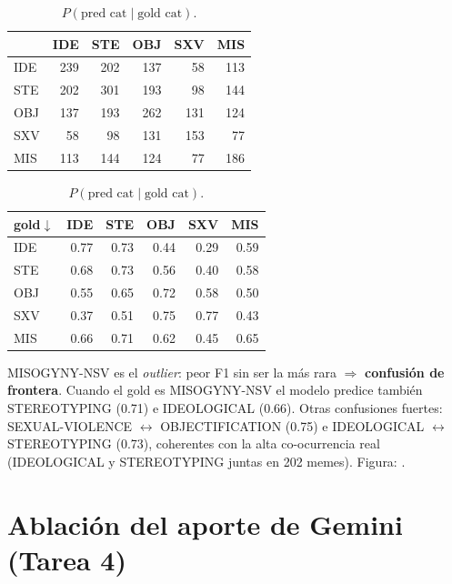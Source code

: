 \documentclass[11pt,a4paper]{article}
\newcommand{\code}[1]{\texttt{\detokenize{#1}}}
\begin{document}
\begin{table}[h]\centering\small
\begin{minipage}[t]{0.48\textwidth}\centering
\caption{Co-ocurrencia en gold (nº de memes).}
\begin{tabular}{@{}lrrrrr@{}}
\toprule
 & IDE & STE & OBJ & SXV & MIS \\
\midrule
IDE & 239 & 202 & 137 & 58 & 113 \\
STE & 202 & 301 & 193 & 98 & 144 \\
OBJ & 137 & 193 & 262 & 131 & 124 \\
SXV & 58 & 98 & 131 & 153 & 77 \\
MIS & 113 & 144 & 124 & 77 & 186 \\
\bottomrule
\end{tabular}
\end{minipage}\hfill
\begin{minipage}[t]{0.48\textwidth}\centering
\caption{$P(\text{pred cat}\mid\text{gold cat})$.}
\begin{tabular}{@{}lrrrrr@{}}
\toprule
gold$\downarrow$ & IDE & STE & OBJ & SXV & MIS \\
\midrule
IDE & 0.77 & 0.73 & 0.44 & 0.29 & 0.59 \\
STE & 0.68 & 0.73 & 0.56 & 0.40 & 0.58 \\
OBJ & 0.55 & 0.65 & 0.72 & 0.58 & 0.50 \\
SXV & 0.37 & 0.51 & 0.75 & 0.77 & 0.43 \\
MIS & 0.66 & 0.71 & 0.62 & 0.45 & 0.65 \\
\bottomrule
\end{tabular}
\end{minipage}
\end{table}

\begin{finding}[Diagnóstico]
MISOGYNY-NSV es el \emph{outlier}: peor F1 sin ser la más rara $\Rightarrow$ \textbf{confusión de
frontera}. Cuando el gold es MISOGYNY-NSV el modelo predice también STEREOTYPING (0.71) e
IDEOLOGICAL (0.66). Otras confusiones fuertes: SEXUAL-VIOLENCE $\leftrightarrow$ OBJECTIFICATION
(0.75) e IDEOLOGICAL $\leftrightarrow$ STEREOTYPING (0.73), coherentes con la alta co-ocurrencia
real (IDEOLOGICAL y STEREOTYPING juntas en 202 memes). Figura: \code{confusion_2_3.png}.
\end{finding}

\section{Ablación del aporte de Gemini (Tarea 4)}
\end{document}
